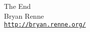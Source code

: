 \AtBeginSubsection[]{}

\begin{frame}[c]
  \begin{center}
    {\Large \textcolor{blue!70!black}{The End}}\\[3em]
    {\large Bryan Renne}\\
    {\scriptsize\href{http://bryan.renne.org}{\texttt{http://bryan.renne.org/}}}
  \end{center}
\end{frame}

